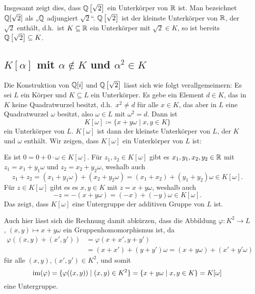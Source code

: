 Insgesamt zeigt dies, dass $\mathbb{Q}\left[\sqrt{2}\right]$ ein Unterkörper von $\mathbb{R}$ ist. Man bezeichnet $\mathbb{Q}[\sqrt{2}]$ als „$\mathbb{Q}$ adjungiert $\sqrt{2}$“. $\mathbb{Q}\left[\sqrt{2}\right]$ ist der kleinste Unterkörper von $\mathbb{R}$, der $\sqrt{2}$ enthält, d.h.\ ist $K \subseteq \mathbb{R}$ ein Unterkörper mit $\sqrt{2} \in K$, so ist bereits $\mathbb{Q}\left[\sqrt{2}\right] \subseteq K$.


\subsection{\texorpdfstring{$K[\alpha]$}{K[α]} mit \texorpdfstring{$\alpha \notin K$}{α not in K} und \texorpdfstring{$\alpha^2 \in K$}{α² in K}}
Die Konstruktion von $\mathbb{Q}[i]$ und $\mathbb{Q}\left[\sqrt{2}\right]$ lässt sich wie folgt verallgemeimern: Es sei $L$ ein Körper und $K \subseteq L$ ein Unterkörper. Es gebe ein Element $d \in K$, das in $K$ keine Quadratwurzel besitzt, d.h.\ $x^2 \neq d$ für alle $x \in K$, das aber in $L$ eine Quadratwurzel $\omega$ besitzt, also $\omega \in L$ mit $\omega^2 = d$. Dann ist
\[
 K[\omega] \coloneqq \{x + y \omega \mid x,y \in K\}
\]
ein Unterkörper von $L$. $K[\omega]$ ist dann der kleinste Unterkörper von $L$, der $K$ und $\omega$ enthält. Wir zeigen, dass $K[\omega]$ ein Unterkörper von $L$ ist:

Es ist $0 = 0 + 0 \cdot \omega \in K[\omega]$. Für $z_1, z_2 \in K[\omega]$ gibt es $x_1, y_1, x_2, y_2 \in \mathbb{R}$ mit $z_1 = x_1 + y_1 \omega$ und $z_2 = x_2 + y_2 \omega$, weshalb auch
\[
 z_1 + z_2
 = (x_1 + y_1 \omega) + (x_2 + y_2 \omega)
 = (x_1 + x_2) + (y_1 + y_2) \omega
 \in K[\omega].
\]
Für $z \in K[\omega]$ gibt es es $x,y \in K$ mit $z = x+y\omega$, weshalb auch
\[
 -z = -(x + y \omega) = (-x) + (-y) \omega \in K[\omega].
\]
Das zeigt, dass $K[\omega]$ eine Untergruppe der additiven Gruppe von $L$ ist.

\begin{bem}
 Auch hier lässt sich die Rechnung damit abkürzen, dass die Abbildung $\varphi \colon K^2 \to L$, $(x,y) \mapsto x+y\omega$ ein Gruppenhomomorphismus ist, da
 \begin{align*}
  \varphi((x,y) + (x',y'))
  &= \varphi(x+x', y+y') \\
  &= (x+x') + (y+y')\omega
  = (x + y\omega) + (x' + y'\omega)
 \end{align*}
 für alle $(x, y), (x', y') \in K^2$, und somit
 \[
  \mathrm{im}(\varphi)
  = \{\varphi((x,y)) \mid (x,y) \in K^2\}
  = \{x+y\omega \mid x,y \in K\}
  = K[\omega]
 \]
 eine Untergruppe.
\end{bem}

